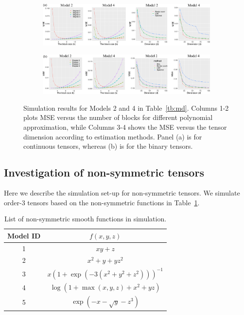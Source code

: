 \documentclass[12pt]{article}
\theoremstyle{definition}
\begin{document}
\begin{figure}[htp!]
    \centering
    \begin{subfigure}[b]{\textwidth}
    \includegraphics[width = \textwidth]{figure/extra_conti.pdf}  
        \vspace{0cm}
    \end{subfigure}
    \begin{subfigure}[b]{\textwidth}
    \includegraphics[width = \textwidth]{figure/extra_binary.pdf}    
    \end{subfigure}
    \caption{Simulation results for Models 2 and 4 in Table~\ref{tb:md}. Columns 1-2 plots MSE versus the number of blocks for different polynomial approximation, while Columns 3-4 shows the MSE versus the tensor dimension according to estimation methods. Panel (a) is for continuous tensors, whereas (b) is for the binary tensors.}
    \label{fig:extrasim1}
\end{figure}



\subsection{Investigation of non-symmetric tensors}\label{subsec:asym}
Here we describe the simulation set-up for non-symmetric tensors. We simulate order-3 tensors based on the non-symmetric functions in Table~\ref{tb:md2}. 

\begin{table}[ht]
    \centering
    \begin{tabular}{c|c}
        Model ID  &  $f(x,y,z)$  \\\hline
        1 &    $xy+z$ \\
        2&  $x^2+y +yz^2$\\
        3 & $x(1+\exp(-3(x^2+y^2+z^2)))^{-1}$\\
        4 & $\log(1+\max(x,y,z)+x^2+yz)$ \\
        5 &  $\exp\left(-x-\sqrt{y}-z^3\right)$
    \end{tabular}
    \caption{List of non-symmetric smooth functions in simulation.}
    \label{tb:md2}
\end{table}
\end{document}
